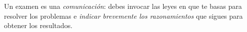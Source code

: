 \documentclass[a4paper,12pt]{exam}
\newcommand*\chem[1]{\ensuremath{\mathrm{#1}}}
\begin{document}
	

\vspace*{1cm}

\begin{minipage}{.07\linewidth}

\end{minipage}\hfill
\begin{minipage}{.93\linewidth}
\begin{problemas}{Un examen es una \textit{comunicación}: debes invocar las leyes en que te basas para resolver los problemas e \textit{indicar brevemente los razonamientos} que sigues para obtener los resultados.}
\end{problemas}
\end{minipage}

\vspace{1ex}




\newpage
	
\end{document}
